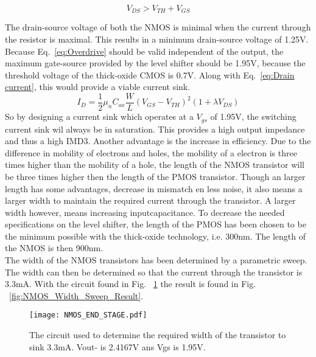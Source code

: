 \begin{equation}
\label{eq:Overdrive}
{V_{DS} > V_{TH} + V_{GS}}

\end{equation}

The drain-source voltage of both the NMOS is minimal when the current through the resistor is maximal. This results in a minimum drain-source voltage of 1.25V. Because Eq.~\ref{eq:Overdrive} should be valid independent of the output, the maximum gate-source provided by the level shifter should be 1.95V, because the threshold voltage of the thick-oxide CMOS is 0.7V. Along with Eq.~\ref{eq:Drain current}, this would provide a viable current sink.
\begin{equation}
{I_D = \frac{1}{2}\mu_n C_{ox}\frac{W}{L}(V_{GS}-V_{TH})^2(1+\lambda V_{DS})}
\label{eq:Drain current}
\end{equation}
So by designing a current sink which operates at a $V_{gs}$ of 1.95V, the  switching current sink wil always be in saturation. This provides a high output impedance and thus a high IMD3. Another advantage is the increase in efficiency.
Due to the difference in mobility of electrons and holes, the mobility of a electron is three times higher than the mobility of a hole, the length of the NMOS transistor will be three times higher then the length of the PMOS transistor. Though an larger length has some advantages, decrease in mismatch en less noise, it also means a larger width to maintain the required current through the transistor. A larger width however, means increasing inputcapacitance. To decrease the needed specifications on the level shifter, the length of the PMOS has been chosen to be the minimum possible with the thick-oxide technology, i.e. 300nm. The length of the NMOS is then 900nm.\\
The width of the NMOS transistors has been determined by a parametric sweep. The width can then be determined so that the current through the transistor is 3.3mA. With the circuit found in Fig. ~\ref{fig:NMOS_Width_Sweep} the result is found in Fig. ~\ref{fig:NMOS_Width_Sweep_Result}.
\begin{figure}
\begin{center}
\texttt{[image: NMOS\_END\_STAGE.pdf]}
\caption{The circuit used to determine the required width of the transistor to sink 3.3mA. Vout- is 2.4167V ans Vgs is 1.95V.}
\label{fig:NMOS_Width_Sweep}
\end{center}
\end{figure}

